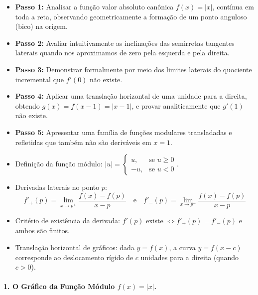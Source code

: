 \begin{estrategiabox}[title=Estratégia Geral de Resolução]
  \begin{itemize}[noitemsep, topsep=2pt]
    \item \textbf{Passo 1:} Analisar a função valor absoluto canônica $f(x) = |x|$, contínua em toda a reta, observando geometricamente a formação de um ponto anguloso (bico) na origem.
    \item \textbf{Passo 2:} Avaliar intuitivamente as inclinações das semirretas tangentes laterais quando nos aproximamos de zero pela esquerda e pela direita.
    \item \textbf{Passo 3:} Demonstrar formalmente por meio dos limites laterais do quociente incremental que $f'(0)$ não existe.
    \item \textbf{Passo 4:} Aplicar uma translação horizontal de uma unidade para a direita, obtendo $g(x) = f(x - 1) = |x - 1|$, e provar analiticamente que $g'(1)$ não existe.
    \item \textbf{Passo 5:} Apresentar uma família de funções modulares transladadas e refletidas que também não são deriváveis em $x = 1$.
  \end{itemize}
\end{estrategiabox}

\begin{recursosbox}[title=Ferramentas Algébricas e Teóricas]
  \begin{itemize}[noitemsep, topsep=2pt]
    \item Definição da função módulo: $|u| = \begin{cases} u, & \text{se } u \ge 0 \\ -u, & \text{se } u < 0 \end{cases}$.
    \item Derivadas laterais no ponto $p$:
    \[
    f'_+(p) = \lim_{x \to p^+} \frac{f(x) - f(p)}{x - p} \quad \text{e} \quad f'_-(p) = \lim_{x \to p^-} \frac{f(x) - f(p)}{x - p}
    \]
    \item Critério de existência da derivada: $f'(p)$ existe $\iff f'_+(p) = f'_-(p)$ e ambos são finitos.
    \item Translação horizontal de gráficos: dada $y = f(x)$, a curva $y = f(x - c)$ corresponde ao deslocamento rígido de $c$ unidades para a direita (quando $c > 0$).
  \end{itemize}
\end{recursosbox}

\paragraph{1. O Gráfico da Função Módulo $f(x) = |x|$.}

